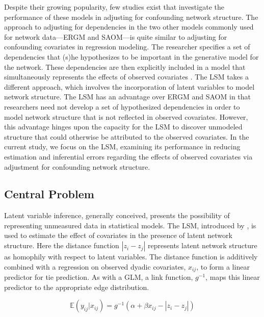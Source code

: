 \documentclass[11pt]{article}
\begin{document}
Despite their growing popularity, few studies exist that investigate the performance of these models in adjusting for confounding network structure.  The approach to adjusting for dependencies in the two other models commonly used for network data---ERGM and SAOM---is quite similar to adjusting for confounding covariates in regression modeling. The researcher specifies a set of dependencies that (s)he hypothesizes to be important in the generative model for the network. These dependencies are then explicitly included in a model that simultaneously represents the effects of observed covariates \citep{cranmer2011pa}. The LSM takes a different approach, which involves the incorporation of latent variables to model network structure. The LSM has an advantage over ERGM and SAOM in that researchers need not develop a set of hypothesized dependencies in order to model network structure that is not reflected in observed covariates. However, this advantage hinges upon the capacity for the LSM to discover unmodeled structure that could otherwise be attributed to the observed covariates. In the current study, we focus on the LSM, examining its performance in reducing estimation and inferential errors regarding the effects of observed covariates via adjustment for confounding network structure.

\subsection{Central Problem}

Latent variable inference, generally conceived, presents the possibility of representing unmeasured data in statistical models. The LSM, introduced by \citet{hoff2002latent}, is used to estimate the effect of covariates in the presence of latent network structure. Here the distance function $|z_i - z_j|$ represents latent network structure as homophily with respect to latent variables.  The distance function is additively combined with a regression on observed dyadic covariates, $x_{ij}$, to form a linear predictor for tie prediction.  As with a GLM, a link function, $g^{-1}$, maps this linear predictor to the appropriate edge distribution.

$$\mathbb{E}(y_{ij} | x_{ij}) = g^{-1}(\alpha + \beta x_{ij} - |z_i - z_j|)$$
\end{document}

